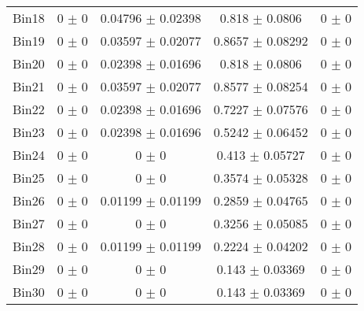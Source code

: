 \begin{tabular}{@{\extracolsep{4pt}}lcccc@{}}
     Bin18 & 0 $\pm$ 0 & 0.04796 $\pm$ 0.02398 & 0.818 $\pm$ 0.0806 & 0 $\pm$ 0 \\ 
     Bin19 & 0 $\pm$ 0 & 0.03597 $\pm$ 0.02077 & 0.8657 $\pm$ 0.08292 & 0 $\pm$ 0 \\ 
     Bin20 & 0 $\pm$ 0 & 0.02398 $\pm$ 0.01696 & 0.818 $\pm$ 0.0806 & 0 $\pm$ 0 \\ 
     Bin21 & 0 $\pm$ 0 & 0.03597 $\pm$ 0.02077 & 0.8577 $\pm$ 0.08254 & 0 $\pm$ 0 \\ 
     Bin22 & 0 $\pm$ 0 & 0.02398 $\pm$ 0.01696 & 0.7227 $\pm$ 0.07576 & 0 $\pm$ 0 \\ 
     Bin23 & 0 $\pm$ 0 & 0.02398 $\pm$ 0.01696 & 0.5242 $\pm$ 0.06452 & 0 $\pm$ 0 \\ 
     Bin24 & 0 $\pm$ 0 & 0 $\pm$ 0 & 0.413 $\pm$ 0.05727 & 0 $\pm$ 0 \\ 
     Bin25 & 0 $\pm$ 0 & 0 $\pm$ 0 & 0.3574 $\pm$ 0.05328 & 0 $\pm$ 0 \\ 
     Bin26 & 0 $\pm$ 0 & 0.01199 $\pm$ 0.01199 & 0.2859 $\pm$ 0.04765 & 0 $\pm$ 0 \\ 
     Bin27 & 0 $\pm$ 0 & 0 $\pm$ 0 & 0.3256 $\pm$ 0.05085 & 0 $\pm$ 0 \\ 
     Bin28 & 0 $\pm$ 0 & 0.01199 $\pm$ 0.01199 & 0.2224 $\pm$ 0.04202 & 0 $\pm$ 0 \\ 
     Bin29 & 0 $\pm$ 0 & 0 $\pm$ 0 & 0.143 $\pm$ 0.03369 & 0 $\pm$ 0 \\ 
     Bin30 & 0 $\pm$ 0 & 0 $\pm$ 0 & 0.143 $\pm$ 0.03369 & 0 $\pm$ 0 \\ 
\hline\hline
  \end{tabular}
